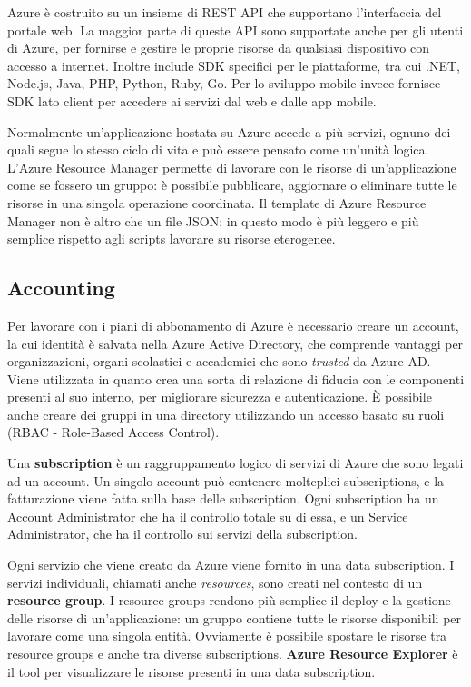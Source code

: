 Azure è costruito su un insieme di REST API che supportano l'interfaccia del portale web. La maggior parte di queste API sono supportate anche per gli utenti di Azure, per fornirse e gestire le proprie risorse da qualsiasi dispositivo con accesso a internet. Inoltre include SDK specifici per le piattaforme, tra cui .NET, Node.js, Java, PHP, Python, Ruby, Go. Per lo sviluppo mobile invece fornisce SDK lato client per accedere ai servizi dal web e dalle app mobile.

Normalmente un'applicazione hostata su Azure accede a più servizi, ognuno dei quali segue lo stesso ciclo di vita e può essere pensato come un'unità logica. L'Azure Resource Manager permette di lavorare con le risorse di un'applicazione come se fossero un gruppo: è possibile pubblicare, aggiornare o eliminare tutte le risorse in una singola operazione coordinata. Il template di Azure Resource Manager non è altro che un file JSON: in questo modo è più leggero e più semplice rispetto agli scripts lavorare su risorse eterogenee.

\subsection{Accounting}
Per lavorare con i piani di abbonamento di Azure è necessario creare un account, la cui identità è salvata nella Azure Active Directory, che comprende vantaggi per organizzazioni, organi scolastici e accademici che sono \textit{trusted} da Azure AD. Viene utilizzata in quanto crea una sorta di relazione di fiducia con le componenti presenti al suo interno, per migliorare sicurezza e autenticazione. È possibile anche creare dei gruppi in una directory utilizzando un accesso basato su ruoli (RBAC - Role-Based Access Control).

Una \textbf{subscription} è un raggruppamento logico di servizi di Azure che sono legati ad un account. Un singolo account può contenere molteplici subscriptions, e la fatturazione viene fatta sulla base delle subscription. Ogni subscription ha un Account Administrator che ha il controllo totale su di essa, e un Service Administrator, che ha il controllo sui servizi della subscription.

\vspace{5mm}

Ogni servizio che viene creato da Azure viene fornito in una data subscription. I servizi individuali, chiamati anche \textit{resources}, sono creati nel contesto di un \textbf{resource group}. I resource groups rendono più semplice il deploy e la gestione delle risorse di un'applicazione: un gruppo contiene tutte le risorse disponibili per lavorare come una singola entità. Ovviamente è possibile spostare le risorse tra resource groups e anche tra diverse subscriptions. \textbf{Azure Resource Explorer} è il tool per visualizzare le risorse presenti in una data subscription.

